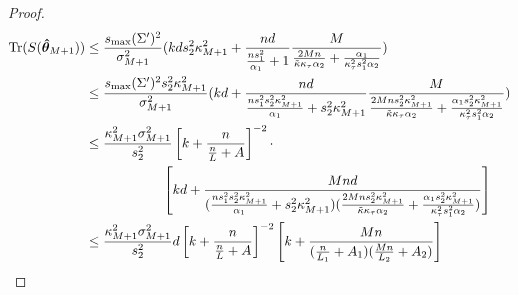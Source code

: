 \begin{proof}
\begin{align}
\mathrm{Tr}(S(\bm{\hat{\theta}}_{M+1}))
& \le \frac{{s_{\max}}({\Sigma'})^2}{\sigma_{M+1}^2}
({k} d s_2^2 \kappa_{M+1}^2  + 
\frac{{n} d}{ \frac{{n}s_1^2}{\alpha_1} + 1} \frac{M}{\frac{2M{n}}{\tilde{\kappa} \kappa_\tau \alpha_2} + \frac{\alpha_1}{\kappa_\tau^2 s_1^2 \alpha_2}})\\
& \le \frac{{s_{\max}}({\Sigma'})^2 s_2^2 \kappa_{M+1}^2}{\sigma_{M+1}^2}
({k} d + 
\frac{{n} d}{ \frac{{n}s_1^2s_2^2 \kappa_{M+1}^2}{\alpha_1} + s_2^2 \kappa_{M+1}^2} \frac{M}{\frac{2M {n} s_2^2 \kappa_{M+1}^2}{\tilde{\kappa} \kappa_\tau \alpha_2} + \frac{\alpha_1 s_2^2 \kappa_{M+1}^2}{\kappa_\tau^2 s_1^2 \alpha_2}})\\
& \le \frac{\kappa_{M+1}^2 \sigma_{M+1}^2}{s_2^2} \left[ {k} + \frac{{n}}{\frac{{n}}{L} + A} \right]^{-2} \cdot \\
& \hspace{2cm}\left[ {k} d + \frac{M{n} d}{ 
(\frac{{n}s_1^2s_2^2 \kappa_{M+1}^2}{\alpha_1} + s_2^2 \kappa_{M+1}^2 ) 
(\frac{2M {n} s_2^2 \kappa_{M+1}^2}{\tilde{\kappa} \kappa_\tau \alpha_2} + \frac{\alpha_1 s_2^2 \kappa_{M+1}^2}{\kappa_\tau^2 s_1^2 \alpha_2})} \right]\\
& \le \frac{\kappa_{M+1}^2 \sigma_{M+1}^2}{s_2^2} d \left[ {k} + \frac{{n}}{\frac{{n}}{L} + A} \right]^{-2} 
\left[ {k} + \frac{M{n}}{ 
(\frac{{n}}{L_1} + A_1 ) 
(\frac{M{n}}{L_2} + A_2)} \right]
\end{align}
\end{proof}

